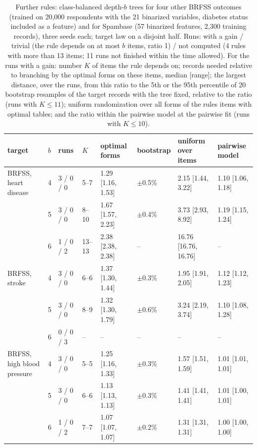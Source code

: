 \begin{table}[h]
\centering
\caption{Further rules: class-balanced depth-$b$ trees for four other BRFSS outcomes (trained on 20,000 respondents with the 21 binarized variables, diabetes status included as a feature) and for Spambase (57 binarized features, 2,300 training records), three seeds each; target law on a disjoint half. Runs: with a gain / trivial (the rule depends on at most $b$ items, ratio 1) / not computed (4 rules with more than 13 items; 11 runs not finished within the time allowed). For the runs with a gain: number $K$ of items the rule depends on; records needed relative to branching by the optimal forms on these items, median [range]; the largest distance, over the runs, from this ratio to the 5th or the 95th percentile of 20 bootstrap resamples of the target records with the tree fixed, relative to the ratio (runs with $K\le11$); uniform randomization over all forms of the rule\textquotesingle s items with optimal tables; and the ratio within the pairwise model at the pairwise fit (runs with $K\le10$).}
\label{tab:rules}
\footnotesize
\setlength{\tabcolsep}{4pt}
\begin{tabular}{llllllll}
\toprule
target & $b$ & runs & $K$ & optimal forms & bootstrap & uniform over items & pairwise model \\
\midrule
BRFSS, heart disease & 4 & 3 / 0 / 0 & 5--7 & 1.29 [1.16, 1.53] & $\pm$0.5\% & 2.15 [1.44, 3.22] & 1.10 [1.06, 1.18] \\
 & 5 & 3 / 0 / 0 & 8--10 & 1.67 [1.57, 2.23] & $\pm$0.4\% & 3.73 [2.93, 8.92] & 1.19 [1.15, 1.24] \\
 & 6 & 1 / 0 / 2 & 13--13 & 2.38 [2.38, 2.38] & -- & 16.76 [16.76, 16.76] & -- \\
BRFSS, stroke & 4 & 3 / 0 / 0 & 6--6 & 1.37 [1.30, 1.44] & $\pm$0.3\% & 1.95 [1.91, 2.05] & 1.12 [1.12, 1.23] \\
 & 5 & 3 / 0 / 0 & 8--9 & 1.32 [1.30, 1.79] & $\pm$0.6\% & 3.24 [2.19, 3.74] & 1.10 [1.08, 1.28] \\
 & 6 & 0 / 0 / 3 & -- & -- & -- & -- & -- \\
BRFSS, high blood pressure & 4 & 3 / 0 / 0 & 5--5 & 1.25 [1.16, 1.33] & $\pm$0.3\% & 1.57 [1.51, 1.59] & 1.01 [1.01, 1.01] \\
 & 5 & 3 / 0 / 0 & 6--6 & 1.13 [1.13, 1.13] & $\pm$0.3\% & 1.41 [1.41, 1.41] & 1.01 [1.00, 1.01] \\
 & 6 & 1 / 0 / 2 & 7--7 & 1.07 [1.07, 1.07] & $\pm$0.2\% & 1.31 [1.31, 1.31] & 1.00 [1.00, 1.00] \\

\end{tabular}
\end{table}
